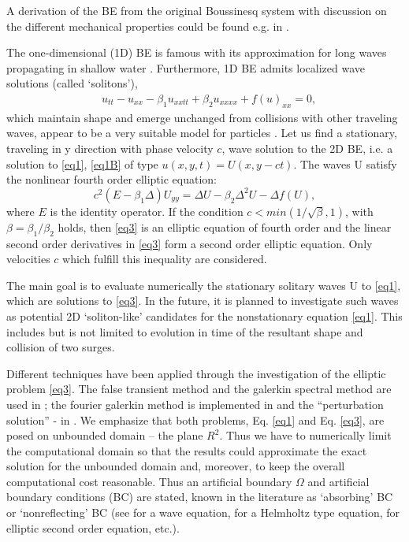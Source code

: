 \documentclass[12pt]{article}
\theoremstyle{theorem}
\theoremstyle{defi}
\begin{document}
A derivation of the BE from the original Boussinesq system with discussion on the different mechanical properties could be found e.g. in \cite{ref1}.

The one-dimensional (1D) BE is famous with its approximation for long waves propagating in shallow water \cite{ref2, ref3}. Furthermore, 1D BE admits localized wave solutions (called ‘solitons’),
\begin{align}
&u_{tt} - u_{xx} -\beta_1  u_{xxtt} +\beta_2 u_{xxxx} + f(u)_{xx} =0, \label{eq2}
\end{align}
which maintain shape and emerge unchanged from collisions with other traveling waves, appear to be a very suitable model for particles \cite{ref4, ref5}.
Let us find a stationary, traveling in y direction with phase velocity $c$, wave solution to the 2D BE, i.e. a solution to \eqref{eq1}, \eqref{eq1B} of type $u(x,y,t)=U(x,y - ct)$. The waves U satisfy the nonlinear fourth order elliptic equation:
\begin{equation}
c^2 (E-\beta_1 \Delta) U_{yy} = \Delta U -\beta_2 \Delta^2 U - \Delta f(U), \label{eq3}
\end{equation}
where $E$ is the identity operator. If the condition $c<min(1/\sqrt{\beta}, 1)$, with $\beta = \beta_1/\beta_2$ holds, then \eqref{eq3} is an elliptic equation of fourth order and the linear second order derivatives in \eqref{eq3} form a second order elliptic equation. Only velocities $c$ which fulfill this inequality are considered.

The main goal is to evaluate numerically the stationary solitary waves U to \eqref{eq1}, which are solutions to \eqref{eq3}. In the future, it is planned to investigate such waves as potential 2D  ‘soliton-like’ candidates for the nonstationary equation \eqref{eq1}. This includes but is not limited to evolution in time of the resultant shape and collision of two surges.

Different techniques have been applied through the investigation of the elliptic problem \eqref{eq3}. The false transient method and the galerkin spectral method are used in \cite{ref6,ref9} ; the fourier galerkin method is implemented in \cite{ref8,ref9} and the ``perturbation solution” - in \cite{ref10}.
We emphasize that both problems, Eq. \eqref{eq1} and Eq. \eqref{eq3}, are posed on unbounded domain – the plane $R^2$. Thus we have to numerically limit the computational domain so that the results could approximate the exact solution for the unbounded domain and, moreover, to keep the overall computational cost reasonable.
Thus an artificial boundary $\Omega$ and artificial boundary conditions (BC) are stated, known in the literature as ‘absorbing’ BC or ‘nonreflecting’ BC (see \cite{ref11} for a wave equation, \cite{ref12} for a Helmholtz type equation, \cite{ref13} for elliptic second order equation, etc.).
\end{document}
